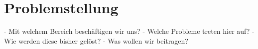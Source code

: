 
\section{Problemstellung}
\label{ch:Problemstellung}
- Mit welchem Bereich beschäftigen wir uns?
- Welche Probleme treten hier auf?
- Wie werden diese bisher gelöst?
- Was wollen wir beitragen?

